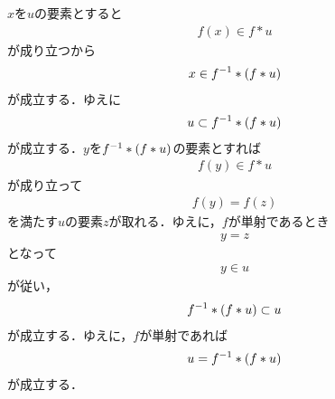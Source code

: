 	\begin{sketch}
		$x$を$u$の要素とすると
		\begin{align}
			f(x) \in f \ast u
		\end{align}
		が成り立つから
		\begin{align}
			x \in {f}^{-1} \ast \left(f \ast u\right)
		\end{align}
		が成立する．ゆえに
		\begin{align}
			u \subset {f}^{-1} \ast \left(f \ast u\right)
		\end{align}
		が成立する．$y$を${f}^{-1} \ast \left(f \ast u\right)$の要素とすれば
		\begin{align}
			f(y) \in f \ast u
		\end{align}
		が成り立って
		\begin{align}
			f(y) = f(z)
		\end{align}
		を満たす$u$の要素$z$が取れる．ゆえに，$f$が単射であるとき
		\begin{align}
			y = z
		\end{align}
		となって
		\begin{align}
			y \in u
		\end{align}
		が従い，
		\begin{align}
			{f}^{-1} \ast \left(f \ast u\right) \subset u
		\end{align}
		が成立する．ゆえに，$f$が単射であれば
		\begin{align}
			u = {f}^{-1} \ast \left(f \ast u\right)
		\end{align}
		が成立する．
		\QED
	\end{sketch}